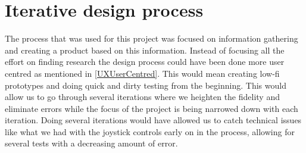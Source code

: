 \section*{Iterative design process}
The process that was used for this project was focused on information gathering and creating a product based on this information.
Instead of focusing all the effort on finding research the design process could have been done more user centred as mentioned in \ref{UXUserCentred}.
This would mean creating low-fi prototypes and doing quick and dirty testing from the beginning. This would allow us to go through several iterations where we heighten the fidelity and eliminate errors while the focus of the project is being narrowed down with each iteration. Doing several iterations would have allowed us to catch technical issues like what we had with the joystick controls early on in the process, allowing for several tests with a decreasing amount of error.
